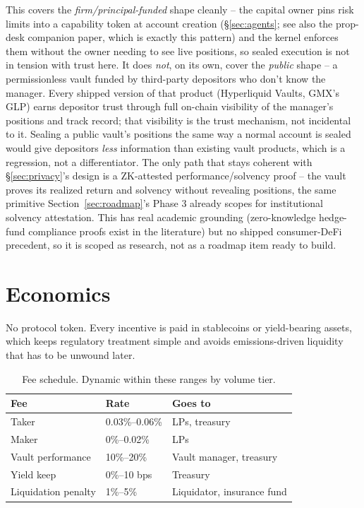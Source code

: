 \documentclass[11pt,a4paper]{article}
\begin{document}
This covers the \emph{firm/principal-funded} shape cleanly -- the capital owner pins risk limits into a capability token at account creation (\S\ref{sec:agents}; see also the prop-desk companion paper, which is exactly this pattern) and the kernel enforces them without the owner needing to see live positions, so sealed execution is not in tension with trust here. It does \emph{not}, on its own, cover the \emph{public} shape -- a permissionless vault funded by third-party depositors who don't know the manager. Every shipped version of that product (Hyperliquid Vaults, GMX's GLP) earns depositor trust through full on-chain visibility of the manager's positions and track record; that visibility is the trust mechanism, not incidental to it. Sealing a public vault's positions the same way a normal account is sealed would give depositors \emph{less} information than existing vault products, which is a regression, not a differentiator. The only path that stays coherent with \S\ref{sec:privacy}'s design is a ZK-attested performance/solvency proof -- the vault proves its realized return and solvency without revealing positions, the same primitive Section~\ref{sec:roadmap}'s Phase 3 already scopes for institutional solvency attestation. This has real academic grounding (zero-knowledge hedge-fund compliance proofs exist in the literature) but no shipped consumer-DeFi precedent, so it is scoped as research, not as a roadmap item ready to build.

\section{Economics}
\label{sec:economics}

No protocol token. Every incentive is paid in stablecoins or yield-bearing assets, which keeps regulatory treatment simple and avoids emissions-driven liquidity that has to be unwound later.

\begin{table}[h]
  \centering
  \begin{tabular}{lll}
    \toprule
    \textbf{Fee} & \textbf{Rate} & \textbf{Goes to} \\
    \midrule
    Taker & 0.03\%--0.06\% & LPs, treasury \\
    Maker & 0\%--0.02\% & LPs \\
    Vault performance & 10\%--20\% & Vault manager, treasury \\
    Yield keep & 0\%--10 bps & Treasury \\
    Liquidation penalty & 1\%--5\% & Liquidator, insurance fund \\
    \bottomrule
  \end{tabular}
  \caption{Fee schedule. Dynamic within these ranges by volume tier.}
  \label{tab:fees}
\end{table}
\end{document}
